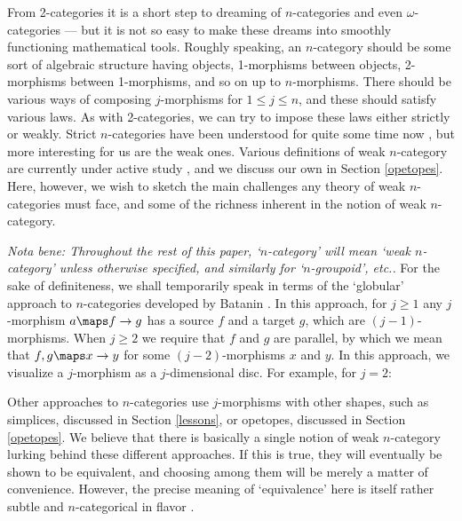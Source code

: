 From 2-categories it is a short step to dreaming of $n$-categories and
even $\omega$-categories --- but it is not so easy to make these dreams
into smoothly functioning mathematical tools.   Roughly speaking, an
$n$-category should be some sort of algebraic structure having objects,
1-morphisms between objects, 2-morphisms between 1-morphisms, and so on
up to $n$-morphisms.  There should be various ways of composing
$j$-morphisms for $1 \le j \le n$, and these should satisfy various
laws.  As with 2-categories, we can try to impose these laws either
strictly or weakly. Strict $n$-categories have been understood for quite
some time now \cite{Crans,EK}, but more interesting for us are the weak
ones.   Various definitions of weak $n$-category are currently under active 
study \cite{BD2,Batanin,HMP,Simpson,Simpson2,Street,Tamsamani,Tamsamani2}, 
and we discuss our own in Section \ref{opetopes}.   Here, however, we
wish to sketch the main challenges any theory of weak $n$-categories
must face, and some of the richness inherent in the notion of weak
$n$-category.    

{\it Nota bene: Throughout the rest of this paper, `$n$-category' will
mean `weak $n$-category' unless otherwise specified, and similarly for
`$n$-groupoid', etc..}   For the sake of definiteness, we shall
temporarily speak in terms of the `globular' approach to $n$-categories
developed by Batanin \cite{Batanin}.  In this approach, for $j \ge 1$
any $j$-morphism $a \maps f \to g$ has a source $f$ and a target $g$,
which are $(j-1)$-morphisms.  When $j \ge 2$ we require that $f$ and $g$
are parallel, by which we mean that $f,g \maps x \to y$ for some
$(j-2)$-morphisms $x$ and $y$.   In this approach, we visualize a
$j$-morphism as a $j$-dimensional disc.   For example, for $j = 2$:

\medskip
\centerline{\epsfysize=1.0in}
\medskip

\noindent Other approaches to $n$-categories use $j$-morphisms with
other shapes, such as simplices, discussed in Section \ref{lessons}, or
opetopes, discussed in Section \ref{opetopes}.  We believe that there is
basically a single notion of weak $n$-category lurking behind these
different approaches.  If this is true, they will eventually be shown to
be equivalent, and choosing among them will be merely a matter of
convenience.  However, the precise meaning of `equivalence' here is
itself rather subtle and $n$-categorical in flavor \cite{B2,BD2}.


